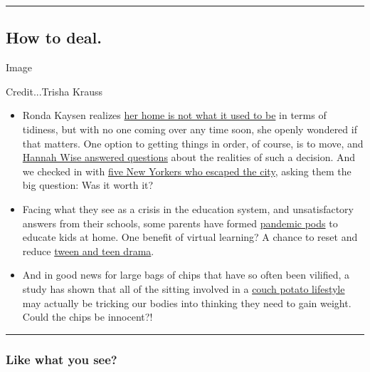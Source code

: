 \begin{center}\rule{0.5\linewidth}{\linethickness}\end{center}

\hypertarget{how-to-deal}{%
\subsection{How to deal.}\label{how-to-deal}}

Image

Credit...Trisha Krauss

\begin{itemize}
\item
  Ronda Kaysen realizes
  \href{https://www.nytimes.com/2020/07/24/realestate/pandemic-housekeeping.html}{her
  home is not what it used to be} in terms of tidiness, but with no one
  coming over any time soon, she openly wondered if that matters. One
  option to getting things in order, of course, is to move, and
  \href{https://www.nytimes.com/2020/07/24/style/moving-during-covid-coronavirus.html}{Hannah
  Wise answered questions} about the realities of such a decision. And
  we checked in with
  \href{https://www.nytimes.com/2020/07/24/nyregion/coronavirus-quick-escapes-nyc.html}{five
  New Yorkers who escaped the city}, asking them the big question: Was
  it worth it?
\item
  Facing what they see as a crisis in the education system, and
  unsatisfactory answers from their schools, some parents have formed
  \href{https://www.nytimes.com/2020/07/22/parenting/school-pods-coronavirus.html}{pandemic
  pods} to educate kids at home. One benefit of virtual learning? A
  chance to reset and reduce
  \href{https://www.nytimes.com/2020/07/23/well/family/quarantine-tween-drama.html}{tween
  and teen drama}.
\item
  And in good news for large bags of chips that have so often been
  vilified, a study has shown that all of the sitting involved in a
  \href{https://www.nytimes.com/2020/07/22/well/move/the-lightness-of-being-a-couch-potato-may-work-to-keep-us-fat.html}{couch
  potato lifestyle} may actually be tricking our bodies into thinking
  they need to gain weight. Could the chips be innocent?!
\end{itemize}

\begin{center}\rule{0.5\linewidth}{\linethickness}\end{center}

\hypertarget{like-what-you-see}{%
\subsubsection{Like what you see?}\label{like-what-you-see}}

